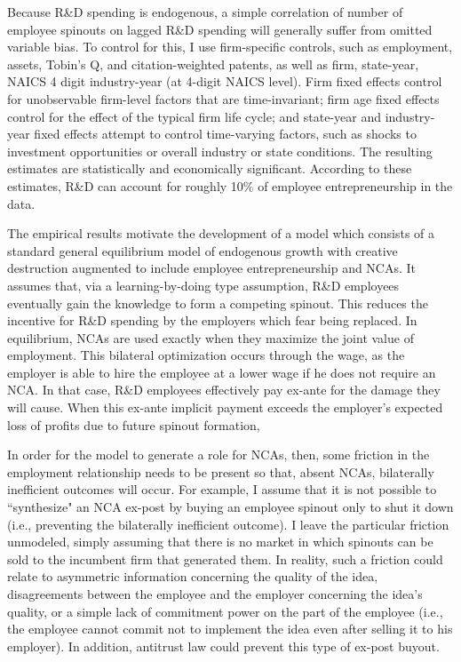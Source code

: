 \documentclass[11pt,english]{article}
\begin{document}
Because R\&D spending is endogenous, a simple correlation of number of employee spinouts on lagged R\&D spending will generally suffer from omitted variable bias. To control for this, I use firm-specific controls, such as employment, assets, Tobin's Q, and citation-weighted patents, as well as firm, state-year, NAICS 4 digit industry-year (at 4-digit NAICS level). Firm fixed effects control for unobservable firm-level factors that are time-invariant; firm age fixed effects control for the effect of the typical firm life cycle; and state-year and industry-year fixed effects attempt to control time-varying factors, such as shocks to investment opportunities or overall industry or state conditions. The resulting estimates are statistically and economically significant. According to these estimates, R\&D can account for roughly 10\% of employee entrepreneurship in the data.

The empirical results motivate the development of a model which consists of a standard general equilibrium model of endogenous growth with creative destruction augmented to include employee entrepreneurship and NCAs. It assumes that, via a learning-by-doing type assumption, R\&D employees eventually gain the knowledge to form a competing spinout. This reduces the incentive for R\&D spending by the employers which fear being replaced. In equilibrium, NCAs are used exactly when they maximize the joint value of employment. This bilateral optimization occurs through the wage, as the employer is able to hire the employee at a lower wage if he does not require an NCA. In that case, R\&D employees effectively pay ex-ante for the damage they will cause. When this ex-ante implicit payment exceeds the employer's expected loss of profits due to future spinout formation, 

In order for the model to generate a role for NCAs, then, some friction in the employment relationship needs to be present so that, absent NCAs, bilaterally inefficient outcomes will occur. For example, I assume that it is not possible to ``synthesize" an NCA ex-post by buying an employee spinout only to shut it down (i.e., preventing the bilaterally inefficient outcome). I leave the particular friction unmodeled, simply assuming that there is no market in which spinouts can be sold to the incumbent firm that generated them. In reality, such a friction could relate to asymmetric information concerning the quality of the idea, disagreements between the employee and the employer concerning the idea's quality, or a simple lack of commitment power on the part of the employee (i.e., the employee cannot commit not to implement the idea even after selling it to his employer). In addition, antitrust law could prevent this type of ex-post buyout.
\end{document}
